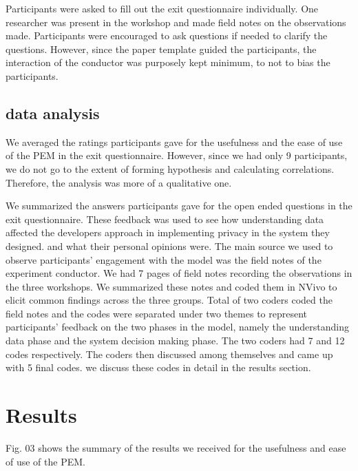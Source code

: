 \documentclass{sigchi}
\begin{document}
Participants were asked to fill out the exit questionnaire individually. One researcher was present in the workshop and made field notes on the observations made. Participants were encouraged to ask questions if needed to clarify the questions. However, since the paper template guided the participants, the interaction of the conductor was purposely kept minimum, to not to bias the participants.

\subsection {data analysis}

We averaged the ratings participants gave for the usefulness and the ease of use of the PEM in the exit questionnaire. However, since we had only 9 participants, we do not go to the extent of forming hypothesis and calculating correlations. Therefore, the analysis was more of a qualitative one. 

We summarized the answers participants gave for the open ended questions in the exit questionnaire. These feedback was used to see how understanding data affected the developers approach in implementing privacy in the system they designed. and what their personal opinions were. The main source we used to observe participants' engagement with the model was the field notes of the experiment conductor. We had 7 pages of field notes recording the observations in the three workshops. We summarized these notes and coded them in NVivo to elicit common findings across the three groups. Total of two coders coded the field notes and the codes were separated under two themes to represent participants' feedback on the two phases in the model, namely the understanding data phase and the system decision making phase. The two coders had 7 and 12 codes respectively. The coders then discussed among themselves and came up with 5 final codes. we discuss these codes in detail in the results section.

\section {Results}

Fig. 03 shows the summary of the results we received for the usefulness and ease of use of the PEM.

\end{document}

